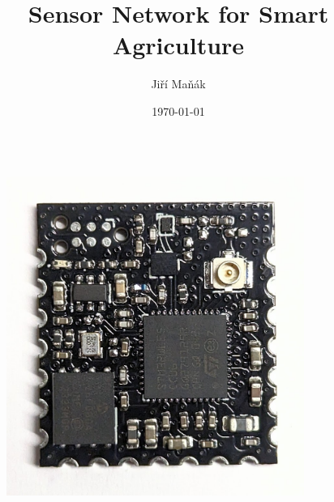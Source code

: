 \documentclass{beamer}
\title{Sensor Network for Smart Agriculture}
\author{Jiří Maňák}
\date{\today}
\begin{document}
\begin{frame}
\titlepage
\end{frame}


\begin{frame}
\begin{columns}
\begin{column}{.5\textwidth}
    \begin{figure}
        \centering
        \includegraphics[width=\linewidth]{img/module-v0.1.jpg}
    \end{figure}
\end{column}
\hfil
\begin{column}{.5\textwidth}
    \begin{figure}
        \centering

\end{figure}
\end{column}
\end{columns}
\end{frame}
\end{document}
